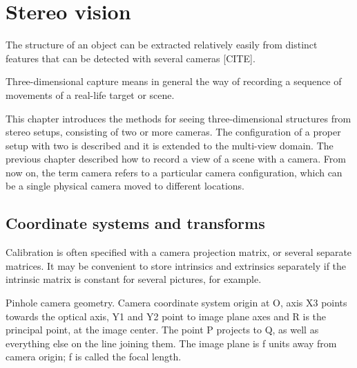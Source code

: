 \section{Stereo vision}

The structure of an object can be extracted relatively easily from distinct features that can be detected with several cameras [CITE].

Three-dimensional capture means in general the way of recording a sequence of movements of a real-life target or scene.


This chapter introduces the methods for seeing three-dimensional structures from stereo setups, consisting of two or more cameras.
The configuration of a proper setup with two is described and it is extended to the multi-view domain.
The previous chapter described how to record a view of a scene with a camera. From now on, the term camera refers to a particular camera configuration, which can be a single physical camera moved to different locations.

\subsection{Coordinate systems and transforms}

Calibration is often specified with a camera projection matrix, or several separate matrices.
It may be convenient to store intrinsics and extrinsics separately if the intrinsic matrix is constant for several pictures, for example.

{Pinhole camera geometry. Camera coordinate system origin at O, axis X3 points towards the optical axis, Y1 and Y2 point to image plane axes and R is the principal point, at the image center. The point P projects to Q, as well as everything else on the line joining them. The image plane is f units away from camera origin; f is called the focal length.}

